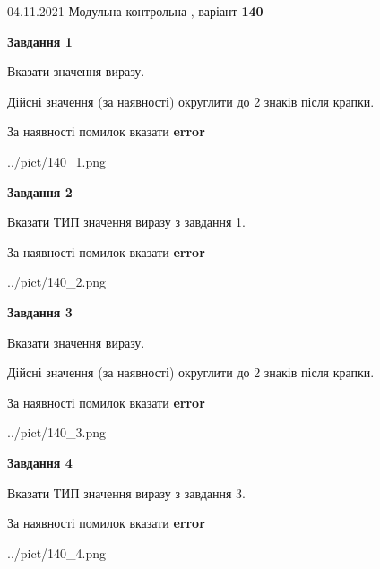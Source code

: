 \documentclass[11pt, ukrainian]{article}
\begin{document}
{04.11.2021 Модульна контрольна , варіант  \No \textbf { 140 }\par}
{
\begin {large}
{\begin {center}\textbf{Завдання 1}\end {center}}\par
Вказати значення виразу. \par
Дійсні значення (за наявності) округлити до 2 знаків після крапки. \par
За наявності помилок вказати \textbf{error}

\begin{center}
	{../pict/140_1.png}
\end{center}
\newpage

{\begin {center}\textbf{Завдання 2}\end {center}}\par
Вказати ТИП значення виразу з завдання 1. \par
За наявності помилок вказати \textbf{error}

\begin{center}
	{../pict/140_2.png}
\end{center}
\newpage

{\begin {center}\textbf{Завдання 3}\end {center}}\par
Вказати значення виразу. \par
Дійсні значення (за наявності) округлити до 2 знаків після крапки. \par
За наявності помилок вказати \textbf{error}

\begin{center}
	{../pict/140_3.png}
\end{center}
\newpage

{\begin {center}\textbf{Завдання 4}\end {center}}\par
Вказати ТИП значення виразу з завдання 3. \par
За наявності помилок вказати \textbf{error}

\begin{center}
	{../pict/140_4.png}
\end{center}
\newpage


\end{large}}
\end{document}
